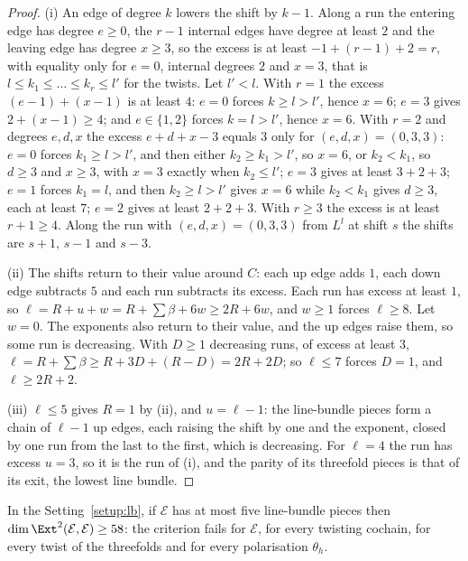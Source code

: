 \begin{proof}
(i) An edge of degree $k$ lowers the shift by $k-1$. Along a run the entering edge has degree $e\ge0$, the $r-1$ internal edges have degree at least $2$ and the leaving edge has degree $x\ge3$, so the excess is at least $-1+(r-1)+2=r$, with equality only for $e=0$, internal degrees $2$ and $x=3$, that is $l\le k_{1}\le\dots\le k_{r}\le l'$ for the twists. Let $l'<l$. With $r=1$ the excess $(e-1)+(x-1)$ is at least $4$: $e=0$ forces $k\ge l>l'$, hence $x=6$; $e=3$ gives $2+(x-1)\ge4$; and $e\in\{1,2\}$ forces $k=l>l'$, hence $x=6$. With $r=2$ and degrees $e,d,x$ the excess $e+d+x-3$ equals $3$ only for $(e,d,x)=(0,3,3)$: $e=0$ forces $k_{1}\ge l>l'$, and then either $k_{2}\ge k_{1}>l'$, so $x=6$, or $k_{2}<k_{1}$, so $d\ge3$ and $x\ge3$, with $x=3$ exactly when $k_{2}\le l'$; $e=3$ gives at least $3+2+3$; $e=1$ forces $k_{1}=l$, and then $k_{2}\ge l>l'$ gives $x=6$ while $k_{2}<k_{1}$ gives $d\ge3$, each at least $7$; $e=2$ gives at least $2+2+3$. With $r\ge3$ the excess is at least $r+1\ge4$. Along the run with $(e,d,x)=(0,3,3)$ from $L^{l}$ at shift $s$ the shifts are $s+1$, $s-1$ and $s-3$.

(ii) The shifts return to their value around $C$: each up edge adds $1$, each down edge subtracts $5$ and each run subtracts its excess. Each run has excess at least $1$, so $\ell=R+u+w=R+\sum\beta+6w\ge2R+6w$, and $w\ge1$ forces $\ell\ge8$. Let $w=0$. The exponents also return to their value, and the up edges raise them, so some run is decreasing. With $D\ge1$ decreasing runs, of excess at least $3$, $\ell=R+\sum\beta\ge R+3D+(R-D)=2R+2D$; so $\ell\le7$ forces $D=1$, and $\ell\ge2R+2$.

(iii) $\ell\le5$ gives $R=1$ by (ii), and $u=\ell-1$: the line-bundle pieces form a chain of $\ell-1$ up edges, each raising the shift by one and the exponent, closed by one run from the last to the first, which is decreasing. For $\ell=4$ the run has excess $u=3$, so it is the run of (i), and the parity of its threefold pieces is that of its exit, the lowest line bundle.
\end{proof}

\begin{theorem}\label{thm:fivebundles}
In the Setting~\ref{setup:lb}, if $\mathcal{E}$ has at most five line-bundle pieces then $\dim\Ext^{2}(\mathcal{E},\mathcal{E})\ge58$: the criterion fails for $\mathcal{E}$, for every twisting cochain, for every twist of the threefolds and for every polarisation $\theta_{h}$.
\end{theorem}

